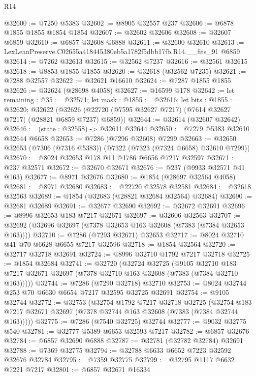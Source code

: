 \begin{lexlean}{R14}
\begin{coremodule}
@32600 := @7250 @5383
@32602 := @8905 @32557 @237
@32606 := @6878 @1855 @1855 @1854 @1854
@32607 := @32602 @32606
@32608 := @32607 @6859
@32610 := @6857 @32608 @6888
@32611 := @32600 @32610
@32613 := LexLeanPreserve.C02655a418445380eb5a1782f5dbb17fb.R14.__fits_91 @6859
@32614 := @7262 @32613
@32615 := @32562 @7237
@32616 := @32561 @32615
@32618 := @8853 @1855 @1855
@32620 := @32618 (@32562 @7235)
@32621 := @7288 @32557
@32622 := @32621 @16610
@32624 := @7287 @1855 @1855
@32626 := @32624 (@28698 @4058)
@32627 := @16599 @178
@32642 := let remaining : @35 := @32571;
  let mask : @1855 := @32616;
  let bits : @1855 := @32620;
  @32622 (@32626 (@22720 (@7595 @32627 @7217) (@7614 @32627 @7217) (@28821 @6859 @7237) @6859))
@32644 := @32614 (@32607 @32642)
@32646 := (state : @32558) -> @32611 @32644
@32650 := @7279 @5383 @32610 @32644 @6658
@32653 := @7286 (@7296 @32608) @7299
@32663 := @32650 @32653 (@7306 (@7316 @5383)) (@7322 (@7323 (@7324 @6658) @32610 @7299))
@32670 := @8024 @32653 @178 @11 @1786 @6656 @7217 @32597
@32671 := @237 @32571
@32672 := @32670 @32671
@32676 := @237 (@9933 @32571 @41 @163)
@32677 := @8971 @32676
@32680 := @1854 (@28697 @32564 @4058)
@32681 := @8971 @32680
@32683 := @22720 @32578 @32581
@32684 := @32618 @32563
@32689 := @1854 (@32683 (@28821 @32684 @32564) @32684)
@32690 := @32681 @32689
@32691 := @32677 @32690
@32692 := @32672 @32691
@32696 := @8996 @32653 @183 @7217 @32671
@32697 := @32606 @32563
@32707 := @32692 (@32696 @32697 (@7378 @32653 @163 @32608 (@7383 (@7384 @32653 @163))))
@32710 := @7286 (@7293 @32671) @32653
@32717 := @8024 @32710 @41 @70 @6628 @6655 @7217 @32596
@32718 := @1854 @32564
@32720 := @32717 @32718 @32691
@32724 := @8996 @32710 @1792 @7217 @32718
@32725 := @1854 @32684
@32741 := @32720
    (@32724
      @32725
      (@9105
        @32710
        @183
        @7217
        @32671
        @32697
        (@7378 @32710 @163 @32608 (@7383 (@7384 @32710 @163)))))
@32744 := @7286 (@7290 @32718) @32710
@32753 := @8024 @32744 @253 @70 @6630 @6654 @7217 @32595 @32725 @32691
@32754 := @9105 @32744
@32772 := @32753
    (@32754
      @1792
      @7217
      @32718
      @32725
      (@32754 @183 @7217 @32671 @32697 (@7378 @32744 @163 @32608 (@7383 (@7384 @32744 @163)))))
@32775 := @7286 (@7540 @32725) @32744
@32777 := @9032 @32775 @540
@32781 := @32777 @5389 @6653 @32593 @7217
@32782 := @6857 @32676
@32784 := @6857 @32690 @6888
@32787 := @32781 (@32782 @32784) @32691
@32788 := @7369 @32775
@32794 := @32788 @6633 @6652 @7223 @32592 @32676 @32784
@32795 := @7359 @32775
@32799 := @32795 @1117 @6632 @7221 @7217
@32801 := @6857 @32671 @16334

\end{coremodule}
\end{lexlean}
